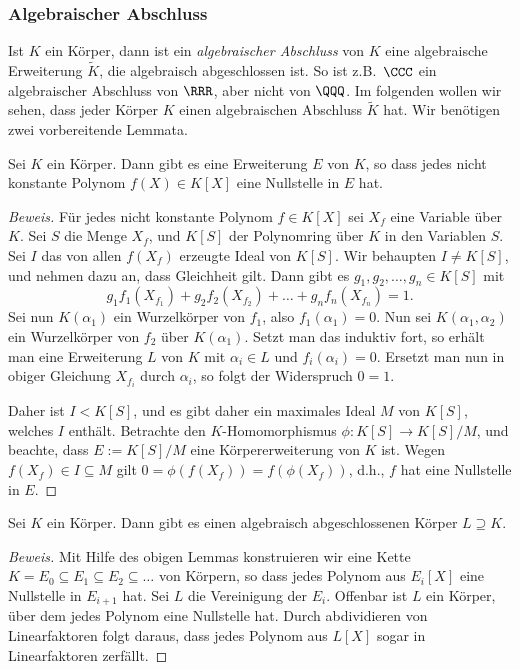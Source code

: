 \documentclass[12pt,a4paper,twoside]{article}
\newcommand{\ei}[1]{\emph{#1}\index{#1}}
\begin{document}
\subsubsection{Algebraischer Abschluss}
Ist $K$ ein K\"orper, dann ist ein \ei{algebraischer Abschluss} von $K$ eine
algebraische Erweiterung $\tilde K$, die algebraisch abgeschlossen ist. So ist
z.B.\ $\CCC$ ein algebraischer Abschluss von $\RRR$, aber nicht von $\QQQ$. Im
folgenden wollen wir sehen, dass jeder K\"orper $K$ einen algebraischen
Abschluss $\tilde K$ hat. Wir ben\"otigen zwei vorbereitende Lemmata.
\begin{Lemma}
  Sei $K$ ein K\"orper. Dann gibt es eine Erweiterung $E$ von $K$, so dass
  jedes nicht konstante Polynom $f(X)\in K[X]$ eine Nullstelle in $E$ hat.
\end{Lemma}
\begin{proof}[Beweis]
  F\"ur jedes nicht konstante Polynom $f\in K[X]$ sei $X_f$ eine Variable
  \"uber $K$. Sei $S$ die Menge $X_f$, und $K[S]$ der Polynomring \"uber $K$
  in den Variablen $S$. Sei $I$ das von allen $f(X_f)$ erzeugte Ideal von
  $K[S]$. Wir behaupten $I\ne K[S]$, und nehmen dazu an, dass Gleichheit gilt.
  Dann gibt es $g_1,g_2,\dots,g_n\in K[S]$ mit
\[
g_1f_1(X_{f_1})+g_2f_2(X_{f_2})+\dots+g_nf_n(X_{f_n})=1.
\]
Sei nun $K(\alpha_1)$ ein Wurzelk\"orper von $f_1$, also
$f_1(\alpha_1)=0$. Nun sei $K(\alpha_1,\alpha_2)$ ein Wurzelk\"orper von $f_2$
\"uber $K(\alpha_1)$. Setzt man das induktiv fort, so erh\"alt man eine
Erweiterung $L$ von $K$ mit $\alpha_i\in L$ und $f_i(\alpha_i)=0$. Ersetzt man
nun in obiger Gleichung $X_{f_i}$ durch $\alpha_i$, so folgt der Widerspruch
$0=1$.

Daher ist $I<K[S]$, und es gibt daher ein maximales Ideal $M$ von $K[S]$,
welches $I$ enth\"alt. Betrachte den $K$-Homomorphismus $\phi:K[S]\to K[S]/M$,
und beachte, dass $E:=K[S]/M$ eine K\"orpererweiterung von $K$ ist. Wegen
$f(X_f)\in I\subseteq M$ gilt $0=\phi(f(X_f))=f(\phi(X_f))$, d.h., $f$ hat
eine Nullstelle in $E$.
\end{proof}
\begin{Lemma}
  Sei $K$ ein K\"orper. Dann gibt es einen algebraisch abgeschlossenen
  K\"orper $L\supseteq K$.
\end{Lemma}
\begin{proof}[Beweis]
  Mit Hilfe des obigen Lemmas konstruieren wir eine Kette $K=E_0\subseteq
  E_1\subseteq E_2\subseteq\dots$ von K\"orpern, so dass jedes Polynom aus
  $E_i[X]$ eine Nullstelle in $E_{i+1}$ hat. Sei $L$ die Vereinigung der
  $E_i$. Offenbar ist $L$ ein K\"orper, \"uber dem jedes Polynom eine
  Nullstelle hat. Durch abdividieren von Linearfaktoren folgt daraus, dass
  jedes Polynom aus $L[X]$ sogar in Linearfaktoren zerf\"allt.
\end{proof}
\end{document}

